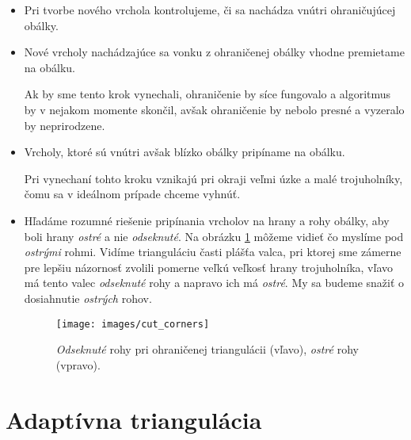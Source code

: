 \begin{itemize}
    \item{
        Pri tvorbe nového vrchola kontrolujeme, či sa nachádza vnútri ohraničujúcej obálky.
    }
    \item{
        Nové vrcholy nachádzajúce sa vonku z ohraničenej obálky vhodne premietame na obálku.

        Ak by sme tento krok vynechali, ohraničenie by síce fungovalo a algoritmus by v nejakom
        momente skončil, avšak ohraničenie by nebolo presné a vyzeralo by neprirodzene.
    }
    \item{
        Vrcholy, ktoré sú vnútri avšak blízko obálky pripíname na obálku.

        Pri vynechaní tohto kroku vznikajú pri okraji veľmi úzke a malé trojuholníky, čomu 
        sa v ideálnom prípade chceme vyhnúť.
    }
    \item{
        Hľadáme rozumné riešenie pripínania vrcholov na hrany a rohy obálky, aby boli hrany 
        \textit{ostré} 
        a nie \textit{odseknuté}. Na obrázku \ref{obr:cut_corners} môžeme vidieť čo myslíme pod 
        \textit{ostrými} rohmi. Vidíme trianguláciu časti plášťa valca, pri ktorej sme zámerne pre
        lepšiu názornosť zvolili
        pomerne veľkú veľkosť hrany trojuholníka, vľavo má tento valec 
        \textit{odseknuté} rohy a napravo ich má \textit{ostré}. My sa budeme snažiť o dosiahnutie
        \textit{ostrých} rohov.

        \begin{figure}
            \centerline{\texttt{[image: images/cut\_corners]}}
            \caption[\textit{Ostré} a \textit{odseknuté} rohy pri ohraničenej triangulácii]
            {\textit{Odseknuté} rohy pri ohraničenej triangulácii (vľavo), \textit{ostré} rohy (vpravo).}
            \label{obr:cut_corners}
        \end{figure}
    }
\end{itemize}

\section{Adaptívna triangulácia}

